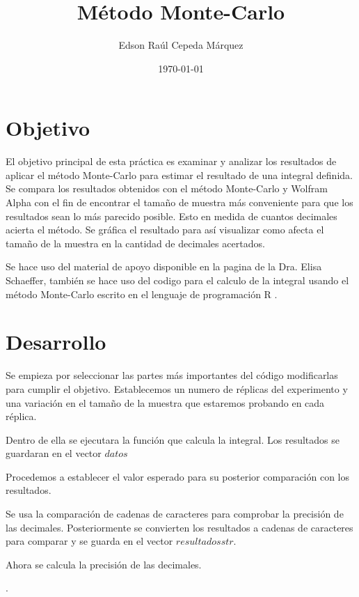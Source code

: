 \documentclass{article}
\author{Edson Raúl Cepeda Márquez}
\title{Método Monte-Carlo}
\date{\today}
\begin{document}
\maketitle

\section{Objetivo}
El objetivo principal de esta práctica es examinar y analizar los resultados de aplicar el método Monte-Carlo para estimar el resultado de una integral definida.
Se compara los resultados obtenidos con el método Monte-Carlo y Wolfram Alpha con el fin de encontrar el tamaño de muestra  más conveniente para que los resultados sean lo más parecido posible. Esto en medida de cuantos decimales acierta el método. Se gráfica el resultado para así visualizar como afecta el tamaño de la muestra en la cantidad de decimales acertados.

Se hace uso del material de apoyo disponible en la pagina \cite{satu} de la Dra. Elisa Schaeffer, también se hace uso del codigo para el calculo de la integral usando el método Monte-Carlo escrito en el lenguaje de programación R \cite{r}.

\section{Desarrollo}
Se empieza por seleccionar las partes más importantes del código  modificarlas para cumplir el objetivo.
Establecemos un numero de réplicas del experimento y una variación en el tamaño de la muestra que estaremos probando en cada réplica.

Dentro de ella se ejecutara la función que calcula la integral.
Los resultados se guardaran en el vector $datos$

Procedemos a establecer el valor esperado para su posterior comparación con los resultados.



Se usa la comparación de cadenas de caracteres para comprobar la precisión de las decimales.
Posteriormente se convierten los resultados a cadenas de caracteres para comparar y se guarda en el vector $resultadosstr$.



Ahora se calcula la precisión de las decimales.

.
\end{document}
